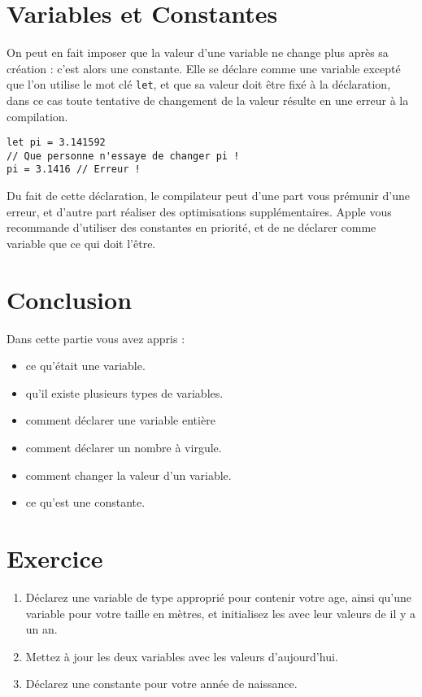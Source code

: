 \section{Variables et Constantes}
On peut en fait imposer que la valeur d'une variable ne change plus après sa création :
c'est alors une constante. Elle se déclare comme une variable excepté que l'on utilise le
mot clé \texttt{let}, et que sa valeur doit être fixé à la déclaration, dans ce cas toute tentative de changement de la valeur résulte en une erreur à la compilation.
\begin{listing}[h]
\begin{verbatim}
let pi = 3.141592
// Que personne n'essaye de changer pi !
pi = 3.1416 // Erreur !
\end{verbatim}
\end{listing}

Du fait de cette déclaration, le compilateur peut d'une part vous prémunir d'une erreur, et
d'autre part réaliser des optimisations supplémentaires. Apple vous recommande d'utiliser
des constantes en priorité, et de ne déclarer comme variable que ce qui doit l'être.
\section*{Conclusion}
{}
Dans cette partie vous avez appris :
\begin{itemize}
\item ce qu'était une variable.
\item qu'il existe plusieurs types de variables.
\item comment déclarer une variable entière
\item comment déclarer un nombre à virgule.
\item comment changer la valeur d'un variable.
\item ce qu'est une constante.
\end{itemize}

\section*{Exercice}
{}
\begin{enumerate}
\item Déclarez une variable de type approprié pour contenir votre age, ainsi qu'une variable pour votre taille en mètres, et initialisez les avec leur valeurs de il y a un an.
\item Mettez à jour les deux variables avec les valeurs d'aujourd'hui.
\item Déclarez une constante pour votre année de naissance.
\end{enumerate}
